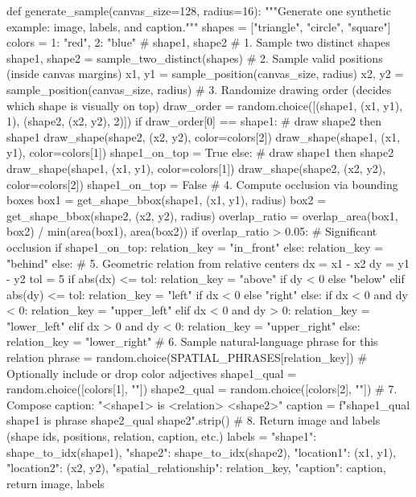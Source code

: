 \begin{RoundedListing}[basicstyle=\fontsize{8}{9}\selectfont\ttfamily\color{atomForeground}]
def generate_sample(canvas_size=128, radius=16):
    """Generate one synthetic example: image, labels, and caption."""
    shapes = ["triangle", "circle", "square"]
    colors = {1: "red", 2: "blue"}  # shape1, shape2
    # 1. Sample two distinct shapes
    shape1, shape2 = sample_two_distinct(shapes)
    # 2. Sample valid positions (inside canvas margins)
    x1, y1 = sample_position(canvas_size, radius)
    x2, y2 = sample_position(canvas_size, radius)
    # 3. Randomize drawing order (decides which shape is visually on top)
    draw_order = random.choice([(shape1, (x1, y1), 1), (shape2, (x2, y2), 2)])
    if draw_order[0] == shape1:
        # draw shape2 then shape1
        draw_shape(shape2, (x2, y2), color=colors[2])
        draw_shape(shape1, (x1, y1), color=colors[1])
        shape1_on_top = True
    else:
        # draw shape1 then shape2
        draw_shape(shape1, (x1, y1), color=colors[1])
        draw_shape(shape2, (x2, y2), color=colors[2])
        shape1_on_top = False
    # 4. Compute occlusion via bounding boxes
    box1 = get_shape_bbox(shape1, (x1, y1), radius)
    box2 = get_shape_bbox(shape2, (x2, y2), radius)
    overlap_ratio = overlap_area(box1, box2) / min(area(box1), area(box2))
    if overlap_ratio > 0.05:
        # Significant occlusion
        if shape1_on_top:
            relation_key = "in_front"
        else:
            relation_key = "behind"
    else:
        # 5. Geometric relation from relative centers
        dx = x1 - x2
        dy = y1 - y2
        tol = 5
        if abs(dx) <= tol:
            relation_key = "above" if dy < 0 else "below"
        elif abs(dy) <= tol:
            relation_key = "left" if dx < 0 else "right"
        else:
            if dx < 0 and dy < 0:
                relation_key = "upper_left"
            elif dx < 0 and dy > 0:
                relation_key = "lower_left"
            elif dx > 0 and dy < 0:
                relation_key = "upper_right"
            else:
                relation_key = "lower_right"
    # 6. Sample natural-language phrase for this relation
    phrase = random.choice(SPATIAL_PHRASES[relation_key])
    # Optionally include or drop color adjectives
    shape1_qual = random.choice([colors[1], ""])
    shape2_qual = random.choice([colors[2], ""])
    # 7. Compose caption: "<shape1> is <relation> <shape2>"
    caption = f"{shape1_qual} {shape1} is {phrase} {shape2_qual} {shape2}".strip()
    # 8. Return image and labels (shape ids, positions, relation, caption, etc.)
    labels = {
        "shape1": shape_to_idx(shape1),
        "shape2": shape_to_idx(shape2),
        "location1": (x1, y1),
        "location2": (x2, y2),
        "spatial_relationship": relation_key,
        "caption": caption,
    }
    return image, labels
\end{RoundedListing}

